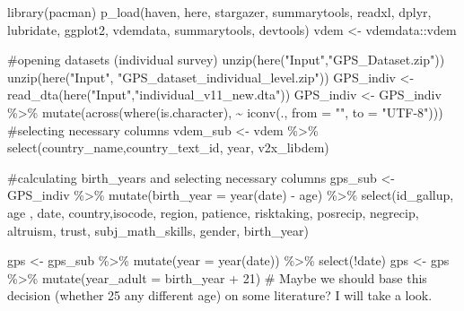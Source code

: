 \documentclass[
  letterpaper,
  DIV=11,
  numbers=noendperiod]{scrartcl}
\newenvironment{Shaded}{\begin{snugshade}}{\end{snugshade}}
\newcommand{\AttributeTok}[1]{\textcolor[rgb]{0.40,0.45,0.13}{#1}}
\newcommand{\CommentTok}[1]{\textcolor[rgb]{0.37,0.37,0.37}{#1}}
\newcommand{\DecValTok}[1]{\textcolor[rgb]{0.68,0.00,0.00}{#1}}
\newcommand{\FunctionTok}[1]{\textcolor[rgb]{0.28,0.35,0.67}{#1}}
\newcommand{\NormalTok}[1]{\textcolor[rgb]{0.00,0.23,0.31}{#1}}
\newcommand{\OtherTok}[1]{\textcolor[rgb]{0.00,0.23,0.31}{#1}}
\newcommand{\SpecialCharTok}[1]{\textcolor[rgb]{0.37,0.37,0.37}{#1}}
\newcommand{\StringTok}[1]{\textcolor[rgb]{0.13,0.47,0.30}{#1}}
\begin{document}
\begin{Shaded}
\begin{Highlighting}[]
\FunctionTok{library}\NormalTok{(pacman)}
\FunctionTok{p\_load}\NormalTok{(haven,}
\NormalTok{       here,}
\NormalTok{       stargazer,}
\NormalTok{       summarytools,}
\NormalTok{       readxl,}
\NormalTok{       dplyr,}
\NormalTok{       lubridate,}
\NormalTok{       ggplot2,}
\NormalTok{       vdemdata,}
\NormalTok{       summarytools,}
\NormalTok{       devtools)}
\NormalTok{vdem }\OtherTok{\textless{}{-}}\NormalTok{ vdemdata}\SpecialCharTok{::}\NormalTok{vdem}

\CommentTok{\#opening datasets (individual survey)}
\FunctionTok{unzip}\NormalTok{(}\FunctionTok{here}\NormalTok{(}\StringTok{"Input"}\NormalTok{,}\StringTok{"GPS\_Dataset.zip"}\NormalTok{))}
\FunctionTok{unzip}\NormalTok{(}\FunctionTok{here}\NormalTok{(}\StringTok{"Input"}\NormalTok{, }\StringTok{"GPS\_dataset\_individual\_level.zip"}\NormalTok{))}
\NormalTok{GPS\_indiv }\OtherTok{\textless{}{-}} \FunctionTok{read\_dta}\NormalTok{(}\FunctionTok{here}\NormalTok{(}\StringTok{"Input"}\NormalTok{,}\StringTok{"individual\_v11\_new.dta"}\NormalTok{))}
\NormalTok{GPS\_indiv }\OtherTok{\textless{}{-}}\NormalTok{ GPS\_indiv }\SpecialCharTok{\%\textgreater{}\%}
  \FunctionTok{mutate}\NormalTok{(}\FunctionTok{across}\NormalTok{(}\FunctionTok{where}\NormalTok{(is.character), }\SpecialCharTok{\textasciitilde{}} \FunctionTok{iconv}\NormalTok{(., }\AttributeTok{from =} \StringTok{""}\NormalTok{, }\AttributeTok{to =} \StringTok{"UTF{-}8"}\NormalTok{)))}
\CommentTok{\#selecting necessary columns}
\NormalTok{vdem\_sub }\OtherTok{\textless{}{-}}\NormalTok{ vdem }\SpecialCharTok{\%\textgreater{}\%}
  \FunctionTok{select}\NormalTok{(country\_name,country\_text\_id, year, v2x\_libdem)}

\CommentTok{\#calculating birth\_years and selecting necessary columns}
\NormalTok{gps\_sub }\OtherTok{\textless{}{-}}\NormalTok{ GPS\_indiv }\SpecialCharTok{\%\textgreater{}\%}
  \FunctionTok{mutate}\NormalTok{(}\AttributeTok{birth\_year =} \FunctionTok{year}\NormalTok{(date) }\SpecialCharTok{{-}}\NormalTok{ age) }\SpecialCharTok{\%\textgreater{}\%}
  \FunctionTok{select}\NormalTok{(id\_gallup, age , date, country,isocode, region, patience, risktaking, posrecip, negrecip, altruism, trust, subj\_math\_skills, gender, birth\_year)}

\NormalTok{gps }\OtherTok{\textless{}{-}}\NormalTok{ gps\_sub }\SpecialCharTok{\%\textgreater{}\%}
  \FunctionTok{mutate}\NormalTok{(}\AttributeTok{year =} \FunctionTok{year}\NormalTok{(date)) }\SpecialCharTok{\%\textgreater{}\%} \FunctionTok{select}\NormalTok{(}\SpecialCharTok{!}\NormalTok{date)}
\NormalTok{gps }\OtherTok{\textless{}{-}}\NormalTok{ gps }\SpecialCharTok{\%\textgreater{}\%}
  \FunctionTok{mutate}\NormalTok{(}\AttributeTok{year\_adult =}\NormalTok{ birth\_year }\SpecialCharTok{+} \DecValTok{21}\NormalTok{) }\CommentTok{\# Maybe we should base this decision (whether 25 any different age) on some literature? I will take a look.}


\end{Highlighting}
\end{Shaded}
\end{document}
